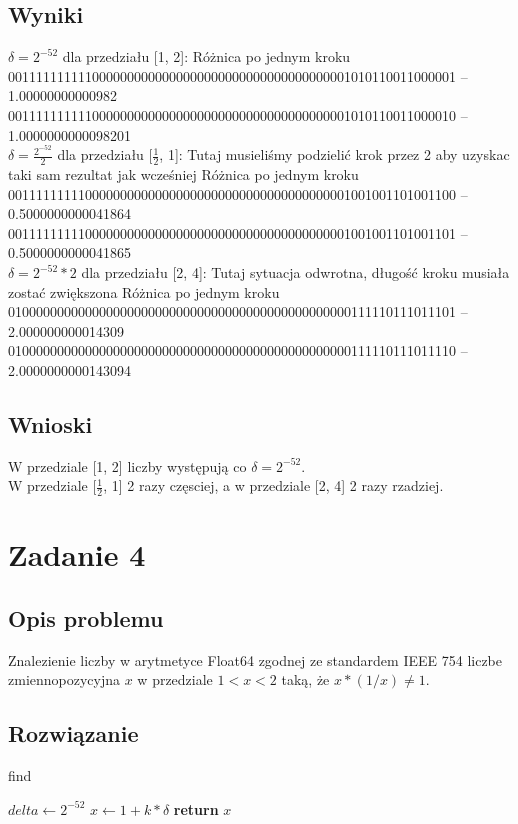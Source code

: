 \documentclass{article}
\begin{document}
\subsection{Wyniki}
	$\delta=2^{-52}$ dla przedziału [1, 2]: 
	Różnica po jednym kroku\\
	0011111111110000000000000000000000000000000000001010110011000001 -- 1.00000000000982\\
	0011111111110000000000000000000000000000000000001010110011000010 -- 1.0000000000098201\\
	$\delta=\frac{2^{-52}}{2}$ dla przedziału [$\frac{1}{2}$, 1]:
	Tutaj musieliśmy podzielić krok przez 2 aby uzyskac taki sam rezultat jak wcześniej 
	Różnica po jednym kroku\\
	0011111111100000000000000000000000000000000000001001001101001100 -- 0.5000000000041864\\
	0011111111100000000000000000000000000000000000001001001101001101 -- 0.5000000000041865\\
	$\delta=2^{-52} * 2$ dla przedziału [2, 4]:
	Tutaj sytuacja odwrotna, długość kroku musiała zostać zwiększona
	Różnica po jednym kroku\\
	0100000000000000000000000000000000000000000000000111110111011101 -- 2.000000000014309\\
	0100000000000000000000000000000000000000000000000111110111011110 -- 2.0000000000143094\\
\subsection{Wnioski}
	W przedziale [1, 2] liczby występują co $\delta=2^{-52}$.\\
	W przedziale [$\frac{1}{2}$, 1] 2 razy częsciej, a w przedziale [2, 4] 2 razy rzadziej.

\section{Zadanie 4}
\subsection{Opis problemu}
    Znalezienie liczby w arytmetyce Float64 zgodnej ze standardem IEEE 754 liczbe zmiennopozycyjna $x$ w przedziale $1<x<2$ taką, że $x*(1/x) \neq 1$.
\subsection{Rozwiązanie}
    \begin{algorithm}
    \caption{find}\label{alg:cap}
    \begin{algorithmic}
        \State $delta \gets 2^{-52}$
        	\State $x \gets 1 + k * \delta$
                \State \textbf{return} $x$
            \EndIf
        \EndFor
    \end{algorithmic}
    \end{algorithm}
\end{document}

